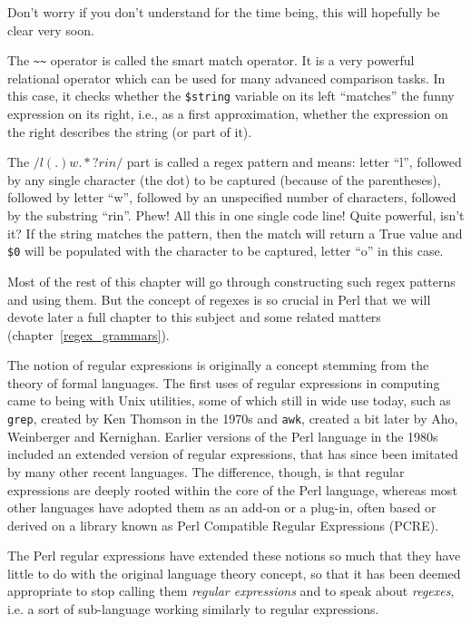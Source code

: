 Don't worry if you don't understand for the time being, this 
will hopefully be clear very soon.

The \verb'~~' operator is called the smart match operator. It is 
a very powerful relational operator which can be used for 
many advanced comparison tasks. In this case, it checks whether 
the {\tt \$string} variable on its left ``matches''  
the funny expression on its right, i.e., as a first 
approximation, whether the expression on the right describes 
the string (or part of it). 

The $/ l (.) w .*? rin /$ part is called a regex pattern and means: 
letter ``l'', followed by any single character (the dot) to be 
captured (because of the parentheses), followed by letter ``w'', 
followed by an unspecified number of characters, followed by the 
substring ``rin''. Phew! All this in one single code line! Quite 
powerful, isn't it? If the string matches the pattern, then 
the match will return a True value and \verb'$0' will be 
populated with the character to be captured, letter ``o'' 
in this case.

Most of the rest of this chapter will go through constructing 
such regex patterns and using them. But the concept of 
regexes is so crucial in Perl that we will devote later a full 
chapter to this subject and some related matters (chapter~\ref{regex_grammars}).

The notion of regular expressions is originally a concept 
stemming from the theory of formal languages. The first 
uses of regular expressions in computing came to being 
with Unix utilities, some of which still in wide use today, such as 
{\tt grep}, created by Ken Thomson in the 1970s and 
{\tt awk}, created a bit later by Aho, Weinberger and Kernighan. 
Earlier versions of the Perl language in the 1980s included an 
extended version of regular expressions, that has since 
been imitated by many other recent languages. The difference, 
though, is that regular expressions are deeply rooted within the 
core of the Perl language, whereas most other languages have 
adopted them as an add-on or a plug-in, often based or derived 
on a library known as Perl Compatible Regular Expressions (PCRE).

The Perl regular expressions have extended these notions 
so much that they have little to do with the original 
language theory concept, so that 
it has been deemed appropriate to stop calling them 
\emph{regular expressions} and to speak about \emph{regexes}, 
i.e. a sort of sub-language working similarly to regular 
expressions.

